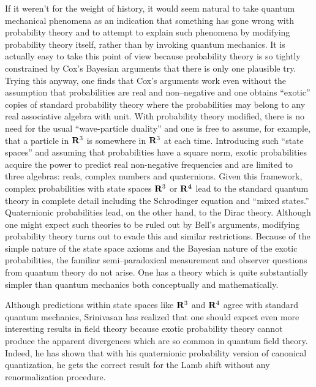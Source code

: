 \documentclass[12pt]{article}
\begin{document}
    If it weren't for the weight of history, it would seem 
natural to take quantum mechanical phenomena as an indication that
something has gone wrong with probability theory and to attempt to 
explain such phenomena by modifying probability theory itself, rather 
than by invoking quantum mechanics.  
It is actually easy to 
take this point of view because probability theory is so tightly 
constrained by Cox's Bayesian arguments\cite{cox} that there is only one 
plausible try.  Trying this anyway\cite{mpl2,pl,mpl1,santafe}, one finds that
Cox's arguments work even without
the assumption that probabilities are real and non--negative and
one obtains ``exotic'' copies of standard probability theory where the probabilities
may belong to any real associative algebra with unit.  With probability
theory modified, there is no need for the usual ``wave-particle duality''
and one is free to assume, for example, that a particle in ${\bf R}^3$ 
is somewhere in ${\bf R}^3$ at each time.  Introducing such ``state spaces''
and assuming that probabilities have a square norm, exotic probabilities
acquire the power to predict real non-negative frequencies and are 
limited to three algebras: reals, complex numbers and quaternions.
Given this framework, 
complex probabilities with state spaces ${\bf R}^3$ or ${\bf R^4}$ lead to 
the standard quantum theory in complete detail including the Schrodinger
equation and ``mixed states.'' Quaternionic probabilities lead,
on the other hand, to the Dirac 
theory\cite{srinivasan1,srinivasan2}.  
Although one might
expect such theories to be ruled out by Bell's arguments, modifying 
probability theory turns out to evade this and similar restrictions\cite{pl}.
Because of the simple
nature of the state space axioms and the Bayesian nature of the exotic 
probabilities, the familiar semi--paradoxical measurement and observer
questions from quantum theory do not arise\cite{santafe}.  One has a 
theory which is quite substantially simpler than quantum mechanics
both conceptually and mathematically.

    Although predictions within state spaces like ${\bf R}^3$ and ${\bf R}^4$ 
agree with standard quantum mechanics, 
Srinivasan has realized that one should expect even more interesting results in 
field theory because exotic probability theory cannot 
produce the apparent divergences which are so common in quantum field theory.  
Indeed, he has shown that with his quaternionic probability version of 
canonical quantization, he gets the correct result for the Lamb shift 
without any renormalization procedure\cite{srinivasan3}.
\end{document}
